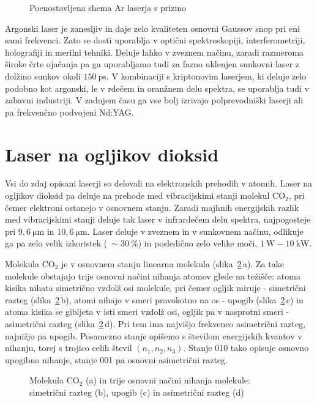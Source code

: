 \begin{figure}[h]
\centering
\def\svgwidth{110truemm} 

\caption{Poenostavljena shema Ar laserja s prizmo}
\label{fig:ArS}
\end{figure}


Argonski laser je zanesljiv in daje zelo kvaliteten osnovni Gaussov snop pri eni
sami frekvenci. Zato se dosti uporablja v optični spektroskopiji,
interferometriji, holografiji in merilni tehniki. Deluje lahko v zveznem načinu,
zaradi razmeroma široke črte ojačanja pa ga uporabljamo tudi za fazno uklenjen
sunkovni laser z dolžino sunkov okoli $150~\si{\pico\second}$. 
V kombinaciji s kriptonovim laserjem, ki deluje zelo podobno kot argonski, 
le v rdečem in oranžnem delu spektra, se uporablja tudi v zabavni industriji.
V zadnjem času ga vse bolj izrivajo polprevodniški laserji ali pa frekvenčno
podvojeni Nd:YAG. 

\section{Laser na ogljikov dioksid}

Vsi do zdaj opisani laserji so delovali na elektronskih prehodih v atomih. 
Laser na ogljikov dioksid pa deluje na prehode med vibracijskimi stanji molekul 
CO$_2$, pri čemer elektroni ostanejo v osnovnem stanju.
Zaradi majhnih energijskih razlik med vibracijskimi stanji deluje
tak laser v infrardečem delu spektra, najpogosteje pri 
$9,6~\si{\micro\metre}$ in $10,6~\si{\micro\metre}$. Laser deluje v zveznem
in v sunkovnem načinu, odlikuje ga pa zelo velik izkoristek ($~\sim 30~\%$) in 
posledično zelo velike moči, $1~\si{\watt} - 10~\si{\kilo\watt}$. 

Molekula CO$_2$ je v osnovnem stanju linearna molekula (slika~\ref{fig:CO2}\,a). 
Za take molekule obstajajo trije osnovni načini nihanja atomov glede na težišče:
atoma kisika nihata simetrično vzdolž osi molekule, pri čemer ogljik miruje -
simetrični razteg (slika~\ref{fig:CO2}\,b), atomi nihajo v smeri pravokotno na 
os - upogib (slika~\ref{fig:CO2}\,c) in atoma kisika se gibljeta v isti smeri 
vzdolž osi, ogljik pa v nasprotni smeri - asimetrični razteg (slika~\ref{fig:CO2}\,d). 
Pri tem ima najvišjo frekvenco asimetrični razteg, najnižjo pa upogib. 
Posamezno stanje opišemo s številom energijskih kvantov 
v nihanju, torej s trojico celih števil $(n_1,n_2,n_3)$. Stanje 010 tako 
opisuje osnovno upogibno nihanje, stanje 001 pa osnovni asimetrični razteg.

\begin{figure}[h]
\centering
\def\svgwidth{100truemm} 

\caption{Molekula CO$_2$ (a) in trije osnovni načini nihanja molekule:
simetrični razteg (b), upogib (c) in asimetrični razteg (d)}
\label{fig:CO2}
\end{figure}

